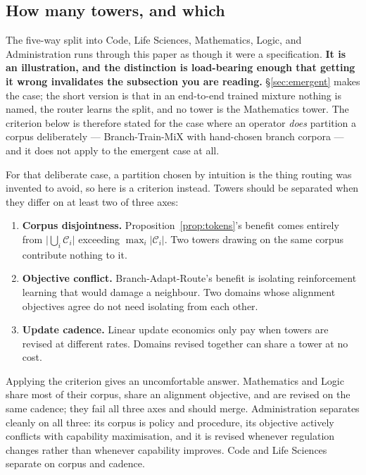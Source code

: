 \documentclass[11pt]{article}
\begin{document}
\subsection{How many towers, and which}
\label{sec:partition}

The five-way split into Code, Life Sciences, Mathematics, Logic, and Administration runs through this paper as though it were a specification. \textbf{It is an illustration, and the distinction is load-bearing enough that getting it wrong invalidates the subsection you are reading.} \S\ref{sec:emergent} makes the case; the short version is that in an end-to-end trained mixture nothing is named, the router learns the split, and no tower is the Mathematics tower. The criterion below is therefore stated for the case where an operator \emph{does} partition a corpus deliberately --- Branch-Train-MiX with hand-chosen branch corpora --- and it does not apply to the emergent case at all.

For that deliberate case, a partition chosen by intuition is the thing routing was invented to avoid, so here is a criterion instead. Towers should be separated when they differ on at least two of three axes:

\begin{enumerate}[label=(P\arabic*),itemsep=2pt]
\item \textbf{Corpus disjointness.} Proposition~\ref{prop:tokens}'s benefit comes entirely from $\bigl|\bigcup_i \mathcal{C}_i\bigr|$ exceeding $\max_i |\mathcal{C}_i|$. Two towers drawing on the same corpus contribute nothing to it.
\item \textbf{Objective conflict.} Branch-Adapt-Route's benefit is isolating reinforcement learning that would damage a neighbour. Two domains whose alignment objectives agree do not need isolating from each other.
\item \textbf{Update cadence.} Linear update economics only pay when towers are revised at different rates. Domains revised together can share a tower at no cost.
\end{enumerate}

Applying the criterion gives an uncomfortable answer. Mathematics and Logic share most of their corpus, share an alignment objective, and are revised on the same cadence; they fail all three axes and should merge. Administration separates cleanly on all three: its corpus is policy and procedure, its objective actively conflicts with capability maximisation, and it is revised whenever regulation changes rather than whenever capability improves. Code and Life Sciences separate on corpus and cadence.
\end{document}
